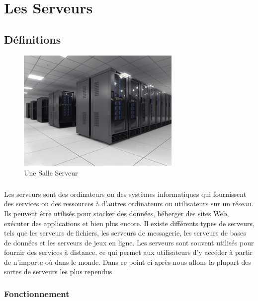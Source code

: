  
 
  \chapter{ Les Serveurs}
 \section{Définitions}

	\begin{figure}[h]
		 \begin{center}
		  \includegraphics[width=0.7\textwidth]{PhotoMemoire/salle-serveur.jpg}
		\caption{Une Salle Serveur}
	\end{center}
	\end{figure}

\paragraph{ }
Les serveurs sont des ordinateurs ou des systèmes informatiques qui fournissent des services ou des ressources à d'autres ordinateurs ou utilisateurs sur un réseau. Ils peuvent être utilisés pour stocker des données, héberger des sites Web, exécuter des applications et bien plus encore. Il existe différents types de serveurs, tels que les serveurs de fichiers, les serveurs de messagerie, les serveurs de bases de données et les serveurs de jeux en ligne. Les serveurs sont souvent utilisés pour fournir des services à distance, ce qui permet aux utilisateurs d'y accéder à partir de n'importe où dans le monde.
 Dans ce point ci-après nous allons la plupart des sortes de serveurs les plus rependus 
 \subsection*{Fonctionnement}

